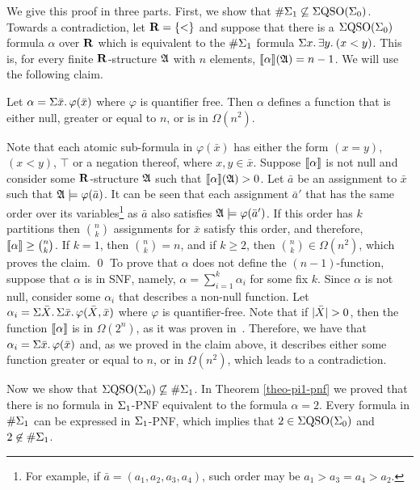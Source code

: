 We give this proof in three parts.
First, we show that $\#\Sigma_{1} \not\subseteq \Sigma{\rm QSO}(\Sigma_{0})$. Towards a contradiction, let $\mathbf{R} = \{ < \}$ and suppose that there is a $\Sigma{\rm QSO}(\Sigma_{0})$ formula $\alpha$ over $\mathbf{R}$ which is equivalent to the $\#\Sigma_{1}$ formula $\Sigma{x}.\, \exists{y}.\: (x < y)$. This is, for every finite $\mathbf{R}$-structure $\mathfrak{A}$ with $n$ elements, ${\llbracket{}{\alpha}\rrbracket}(\mathfrak{A}) = n - 1$. We will use the following claim.
\begin{clm}
	Let $\alpha = \Sigma{\bar{x}}.\,\varphi(\bar{x})$	where $\varphi$ is quantifier free. Then $\alpha$ defines a function that is either null, greater or equal to $n$, or is in $\Omega(n^2)$.
\end{clm}
\proof
	Note that each atomic sub-formula in $\varphi(\bar{x})$ has either the form $(x = y)$, $(x < y)$, $\top$ or a negation thereof, where $x,y\in\bar{x}$. Suppose ${\llbracket{}{\alpha}\rrbracket}$ is not null and consider some $\mathbf{R}$-structure $\mathfrak{A}$ such that ${\llbracket{}{\alpha}\rrbracket}(\mathfrak{A}) > 0$. Let $\bar{a}$ be an assignment to $\bar{x}$ such that $\mathfrak{A}\models\varphi(\bar{a})$. It can be seen that each assignment $\bar{a}'$ that has the same order over its variables\footnote{For example, if $\bar{a} = (a_1,a_2,a_3,a_4)$, such order may be $a_1 > a_3 = a_4 > a_2$.} as $\bar{a}$ also satisfies $\mathfrak{A}\models\varphi(\bar{a}')$. If this order has $k$ partitions then $\binom{n}{k}$ assignments for $\bar{x}$ satisfy this order, and therefore, ${\llbracket{}{\alpha}\rrbracket} \geq \binom{n}{k}$. If $k = 1$, then $\binom{n}{k} = n$, and if $k \geq 2$, then $\binom{n}{k} \in \Omega(n^2)$, which proves the claim.
\qed
To prove that $\alpha$ does not define the $(n-1)$-function, suppose that $\alpha$ is in SNF, namely, $\alpha = \sum_{i = 1}^k \alpha_i$ for some fix $k$. Since $\alpha$ is not null, consider some $\alpha_i$ that describes a non-null function. Let $\alpha_i = \Sigma{\bar{X}}.\,\Sigma{\bar{x}}.\,\varphi(\bar{X},\bar{x})$ where $\varphi$ is quantifier-free. Note that if $\vert \bar{X} \vert > 0$, then the function ${\llbracket{}{\alpha}\rrbracket}$ is in $\Omega(2^n)$, as it was proven in~\cite{SalujaST95}. Therefore, we have that $\alpha_i = \Sigma{\bar{x}}.\,\varphi(\bar{x})$ and, as we proved in the claim above, it describes either some function greater or equal to $n$, or in $\Omega(n^2)$, which leads to a contradiction.

Now we show that $\Sigma{\rm QSO}(\Sigma_{0}) \not\subseteq \#\Sigma_{1}$. In Theorem \ref{theo-pi1-pnf} we proved that there is no formula in $\Sigma_{1}$-PNF equivalent to the formula $\alpha = 2$. Every formula in $\#\Sigma_{1}$ can be expressed in $\Sigma_{1}$-PNF, which implies that $2 \in \Sigma{\rm QSO}(\Sigma_{0})$ and $2 \not\in \#\Sigma_{1}$.

